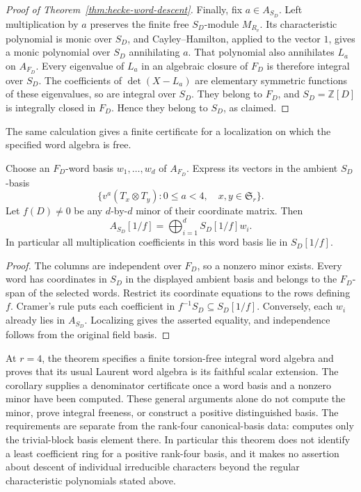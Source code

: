 \begin{proof}[Proof of Theorem~\ref{thm:hecke-word-descent}]
Finally, fix $a\in A_{S_D}$. Left multiplication by $a$ preserves the finite free $S_D$-module $M_{R_v}$. Its characteristic polynomial is monic over $S_D$, and Cayley--Hamilton, applied to the vector $1$, gives a monic polynomial over $S_D$ annihilating $a$. That polynomial also annihilates $L_a$ on $A_{F_D}$. Every eigenvalue of $L_a$ in an algebraic closure of $F_D$ is therefore integral over $S_D$. The coefficients of $\det(X-L_a)$ are elementary symmetric functions of these eigenvalues, so are integral over $S_D$. They belong to $F_D$, and $S_D=\mathbb Z[D]$ is integrally closed in $F_D$. Hence they belong to $S_D$, as claimed.
\end{proof}

The same calculation gives a finite certificate for a localization on which the specified word algebra is free.

\begin{corollary}\label{cor:hecke-word-localization}
Choose an $F_D$-word basis $w_1,\ldots,w_d$ of $A_{F_D}$. Express its vectors in the ambient $S_D$-basis
\[
 \bigl\{v^a(T_x\otimes T_y):0\le a<4,\quad x,y\in\mathfrak S_r\bigr\}.
\]
Let $f(D)\ne0$ be any $d$-by-$d$ minor of their coordinate matrix. Then
\[
 A_{S_D}[1/f]=\bigoplus_{i=1}^d S_D[1/f]w_i.
\]
In particular all multiplication coefficients in this word basis lie in $S_D[1/f]$.
\end{corollary}

\begin{proof}
The columns are independent over $F_D$, so a nonzero minor exists. Every word has coordinates in $S_D$ in the displayed ambient basis and belongs to the $F_D$-span of the selected words. Restrict its coordinate equations to the rows defining $f$. Cramer's rule puts each coefficient in $f^{-1}S_D\subseteq S_D[1/f]$. Conversely, each $w_i$ already lies in $A_{S_D}$. Localizing gives the asserted equality, and independence follows from the original field basis.
\end{proof}

At $r=4$, the theorem specifies a finite torsion-free integral word algebra and proves that its usual Laurent word algebra is its faithful scalar extension. The corollary supplies a denominator certificate once a word basis and a nonzero minor have been computed. These general arguments alone do not compute the minor, prove integral freeness, or construct a positive distinguished basis. The requirements are separate from the rank-four canonical-basis data: \citet[\S5.2]{Mulmuley} computes only the trivial-block basis element there. In particular this theorem does not identify a least coefficient ring for a positive rank-four basis, and it makes no assertion about descent of individual irreducible characters beyond the regular characteristic polynomials stated above.
